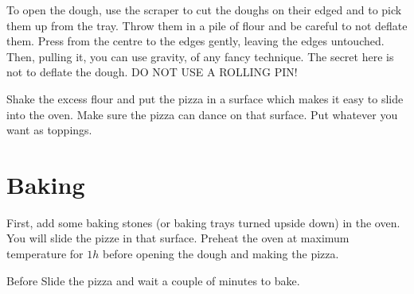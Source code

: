 To open the dough, use the scraper to cut the doughs on their edged and to pick them up from the tray. Throw them in a pile of flour and be careful to not deflate them.
%
Press from the centre to the edges gently, leaving the edges untouched.
%
Then, pulling it, you can use gravity, of any fancy technique. The secret here is not to deflate the dough. DO NOT USE A ROLLING PIN!

Shake the excess flour and put the pizza in a surface which makes it easy to slide into the oven. Make sure the pizza can dance on that surface.
%
Put whatever you want as toppings.


\section{Baking}

First, add some baking stones (or baking trays turned upside down) in the oven. You will slide the pizze in that surface.
%
Preheat the oven at maximum temperature for $1h$ before opening the dough and making the pizza.

Before 
Slide the pizza and wait a couple of minutes to bake.




